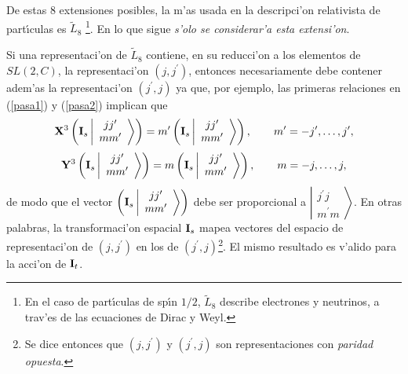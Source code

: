 De estas 8 extensiones posibles, la m'as usada en la descripci'on
relativista de part{\'{\i }}culas es $\widetilde{L}_{8}$ \cite{Cornwell}%
\footnote{%
En el caso de part{\'\i}culas de sp{\'\i}n $1/2$, $\widetilde{L}_{8}$
describe electrones y neutrinos, a trav'es de las ecuaciones de Dirac y
Weyl.}. En lo que sigue {\em s'olo se considerar'a esta extensi'on}.

Si una representaci'on de $\widetilde{L}_{8}$ contiene, en su
reducci'on a los elementos de $SL(2,C)$, la representaci'on $\left(
j,j^{\prime }\right) $, entonces necesariamente debe contener adem'as la
representaci'on $\left( j^{\prime },j\right) $ ya que, por ejemplo, las
primeras relaciones en (\ref{pasa1}) y (\ref{pasa2}) implican que 
\begin{equation}
{\bf X}^3\left( {\bf I}_{s}\left| 
\begin{array}{c}
jj^{\prime } \\ 
mm^{\prime }
\end{array}
\right\rangle \right) =m^{\prime }\left( {\bf I}_{s}\left| 
\begin{array}{c}
jj^{\prime } \\ 
mm^{\prime }
\end{array}
\right\rangle \right) ,\qquad m^{\prime }=-j^{\prime },\ldots ,j^{\prime }, 
\end{equation}
\begin{equation}
{\bf Y}^3\left( {\bf I}_{s}\left| 
\begin{array}{c}
jj^{\prime } \\ 
mm^{\prime }
\end{array}
\right\rangle \right) =m\left( {\bf I}_{s}\left| 
\begin{array}{c}
jj^{\prime } \\ 
mm^{\prime }
\end{array}
\right\rangle \right) ,\qquad m=-j,\ldots ,j, 
\end{equation}
de modo que el vector $\left( {\bf I}_{s}\left| 
\begin{array}{c}
jj^{\prime } \\ 
mm^{\prime }
\end{array}
\right\rangle \right) $ debe ser proporcional a $\left| 
\begin{array}{c}
j^{\prime }j \\ 
m^{\prime }m
\end{array}
\right\rangle $. En otras palabras, la transformaci'on espacial ${\bf I}%
_{s}$ mapea vectores del espacio de representaci'on de $\left(
j,j^{\prime }\right) $ en los de $\left( j^{\prime },j\right) $\footnote{%
Se dice entonces que $\left( j,j^{\prime }\right) $ y $\left( j^{\prime
},j\right) $ son representaciones con {\em paridad opuesta}.}. El mismo
resultado es v'alido para la acci'on de ${\bf I}_{t}$.

